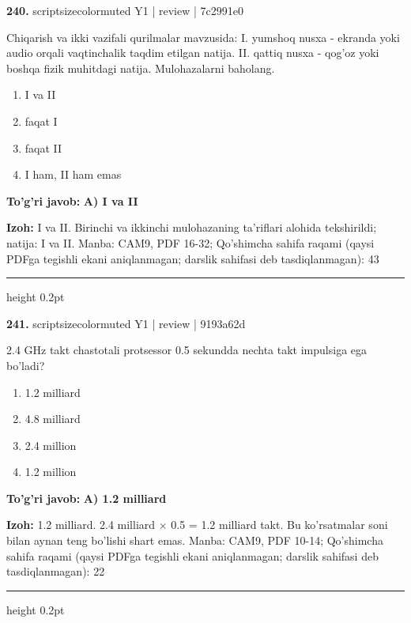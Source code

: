\documentclass[10pt,a4paper]{article}
\begin{document}
{\bfseries\sffamily\color{ink} 240.} {scriptsizecolor{muted} Y1 | review | 7c2991e0}
\par
Chiqarish va ikki vazifali qurilmalar mavzusida: I. yumshoq nusxa - ekranda yoki audio orqali vaqtinchalik taqdim etilgan natija. II. qattiq nusxa - qog'oz yoki boshqa fizik muhitdagi natija. Mulohazalarni baholang.
\begin{enumerate}[label=\Alph*),leftmargin=9mm]
\item I va II
\item faqat I
\item faqat II
\item I ham, II ham emas
\end{enumerate}
\begin{tcolorbox}[enhanced,breakable,colback=teal!4,colframe=teal!60!black,boxrule=0.45pt,arc=1.2mm,left=2.7mm,right=2.7mm,top=1.8mm,bottom=1.8mm,before skip=2mm,after skip=2mm]
{\bfseries\sffamily\color{teal}To'g'ri javob:} \textbf{A) I va II}
\par\smallskip
{\bfseries Izoh:} I va II. Birinchi va ikkinchi mulohazaning ta'riflari alohida tekshirildi; natija: I va II. Manba: CAM9, PDF 16-32; Qo'shimcha sahifa raqami (qaysi PDFga tegishli ekani aniqlanmagan; darslik sahifasi deb tasdiqlanmagan): 43
\end{tcolorbox}
\vspace{2mm}\hrule height 0.2pt\vspace{3mm}

{\bfseries\sffamily\color{ink} 241.} {scriptsizecolor{muted} Y1 | review | 9193a62d}
\par
2.4 GHz takt chastotali protsessor 0.5 sekundda nechta takt impulsiga ega bo'ladi?
\begin{enumerate}[label=\Alph*),leftmargin=9mm]
\item 1.2 milliard
\item 4.8 milliard
\item 2.4 million
\item 1.2 million
\end{enumerate}
\begin{tcolorbox}[enhanced,breakable,colback=teal!4,colframe=teal!60!black,boxrule=0.45pt,arc=1.2mm,left=2.7mm,right=2.7mm,top=1.8mm,bottom=1.8mm,before skip=2mm,after skip=2mm]
{\bfseries\sffamily\color{teal}To'g'ri javob:} \textbf{A) 1.2 milliard}
\par\smallskip
{\bfseries Izoh:} 1.2 milliard. 2.4 milliard \ensuremath{\times} 0.5 = 1.2 milliard takt. Bu ko'rsatmalar soni bilan aynan teng bo'lishi shart emas. Manba: CAM9, PDF 10-14; Qo'shimcha sahifa raqami (qaysi PDFga tegishli ekani aniqlanmagan; darslik sahifasi deb tasdiqlanmagan): 22
\end{tcolorbox}
\vspace{2mm}\hrule height 0.2pt\vspace{3mm}
\end{document}
